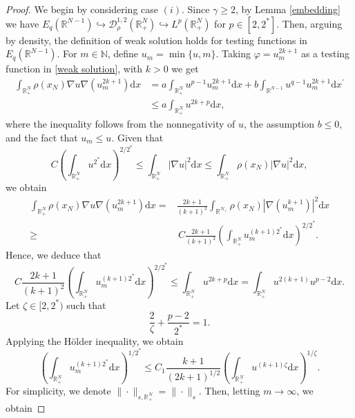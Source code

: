 \documentclass[12pt,reqno]{amsart}
\begin{document}
\begin{proof} We begin by considering case $(i)$. Since $\gamma\geq 2$, by Lemma \ref{embedding} we have $E_q(\mathds{R}^{N-1})\hookrightarrow \mathcal{D}^{1,2}_\rho(\mathds{R}^N_+)\hookrightarrow L^p(\mathds{R}^N_+)$ for $p\in[2,2^\ast]$. Then, arguing by density, the definition of weak solution holds for testing functions in $E_q(\mathds{R}^{N-1})$. For $m\in \mathds{N}$, define $u_m=\min\{u,m\}$. Taking $\varphi=u_m^{2k+1}$ as a testing function in \eqref{weak solution}, with $k>0$ we get
\begin{align*}
    \int_{\mathds{R}^N_+} \rho(x_N)\nabla u\nabla (u_m^{2k+1})\mathrm{d}x&=a\int_{\mathds{R}^N_+}u^{p-1}u_m^{2k+1}\mathrm{d}x+b\int_{\mathds{R}^{N-1}}u^{q-1}u_m^{2k+1}\mathrm{d}x^\prime\\
    &\leq a\int_{\mathds{R}^{N}_+}u^{2k+p}\mathrm{d}x,
\end{align*}
where the inequality follows from the nonnegativity of \( u \), the assumption \( b \leq 0 \), and the fact that \( u_m \leq u \). Given that
\begin{equation*}
C\left(\int_{\mathds{R}^N_+}u^{2^\ast}\mathrm{d}x\right)^{2/2^\ast}\leq \int_{\mathds{R}^N_+}|\nabla u|^2\mathrm{d}x\leq  \int_{\mathds{R}^N_+}\rho(x_N)|\nabla u|^2\mathrm{d}x,
\end{equation*}
we obtain
\begin{align*}
    \int_{\mathds{R}^N_+} \rho(x_N) \nabla u\nabla (u_m^{2k+1})\mathrm{d}x=& \frac{2k+1}{(k+1)^2}\int_{\mathds{R}^{N_+}}\rho(x_N)|\nabla (u_m^{k+1})|^2\mathrm{d}x\\
    \geq& \,C \frac{2k+1}{(k+1)^2}\left(\int_{\mathds{R}^{N}_+}u_m^{(k+1)2^\ast}\mathrm{d}x\right)^{2/2^\ast}.
\end{align*}
Hence, we deduce that
\begin{equation*}
    C \frac{2k+1}{(k+1)^2}\left(\int_{\mathds{R}^{N}_+}u_m^{(k+1) 2^\ast}\mathrm{d}x \right)^{2/2^\ast}\leq \int_{\mathds{R}^N_+}u^{2k+p}\mathrm{d}x =\int_{\mathds{R}^N_+}u^{2(k+1)}u^{p-2}\mathrm{d}x .
\end{equation*}
Let $\zeta \in [2,2^\ast)$ such that
$$
\frac{2}{\zeta}+\frac{p-2}{2^*}=1.
$$
Applying the Hölder inequality, we obtain 
\begin{equation*}
   \left(\int_{\mathds{R}^N_+}u_m^{(k+1) 2^\ast}\mathrm{d}x \right)^{1/ 2^\ast}\leq C_1\frac{k+1}{(2k+1)^{1/2}} \left(\int_{\mathds{R}^N_+}u^{(k+1)\zeta}\mathrm{d}x \right)^{1/\zeta}.
\end{equation*}
For simplicity, we denote $\|\cdot\|_{s,\mathds{R}^N_+}=\|\cdot\|_s$. Then, letting $m\longrightarrow \infty$, we obtain

\end{proof}
\end{document}
